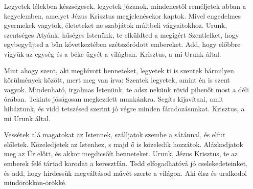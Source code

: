 \documentclass[twoside]{article}
\begin{document}
\begin{psalmsheet}[tone=5, continuous, numeral={II.}]
\end{psalmsheet}

Legyetek lélekben készségesek, legyetek józanok, mindenestől reméljetek abban a kegyelemben, amelyet Jézus Krisztus megjelenésekor kaptok. Mivel engedelmes gyermekek vagytok, életeteket ne szabjátok múltbeli vágyaitokhoz.
Urunk, szentséges Atyánk, hűséges Istenünk, te elküldted a megígért Szentlelket, hogy egybegyűjtsd a bűn következtében szétszóródott embereket. Add, hogy előbbre vigyük az egység és a béke ügyét a világban. Krisztus, a mi Urunk által.

Mint ahogy szent, aki meghívott benneteket, legyetek ti is szentek bármilyen körülmények között, mert meg van írva: Szentek legyetek, amint én is szent vagyok.
Mindenható, irgalmas Istenünk, te adsz nekünk rövid pihenőt most a déli órában. Tekints jóságosan megkezdett munkánkra. Segíts kijavítani, amit hibáztunk, és vidd tetszésed szerint jó végre minden fáradozásunkat. Krisztus, a mi Urunk által.

Vessétek alá magatokat az Istennek, szálljatok szembe a sátánnal, és elfut előletek. Közeledjetek az Istenhez, s majd ő is közeledik hozzátok. Alázkodjatok meg az Úr előtt, és akkor megdicsőít benneteket.
Urunk, Jézus Krisztus, te az emberek felé tártad karodat a keresztfán. Tedd elfogadhatóvá jó cselekedeteinket, és add, hogy hirdessük megváltásod művét szerte a világon. Aki élsz és uralkodol mindörökkön-örökké.
\end{document}
